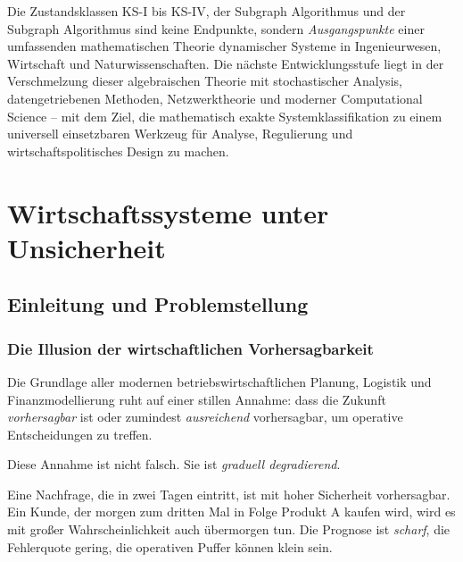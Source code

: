 \documentclass[a4paper, 12pt, twoside, openright]{report}
\theoremstyle{definition}
\theoremstyle{definition}
\begin{document}
Die Zustandsklassen KS-I bis KS-IV, der Subgraph Algorithmus und der Subgraph Algorithmus
sind keine Endpunkte, sondern \emph{Ausgangspunkte} einer umfassenden mathematischen
Theorie dynamischer Systeme in Ingenieurwesen, Wirtschaft und Naturwissenschaften.
Die nächste Entwicklungsstufe liegt in der Verschmelzung dieser algebraischen Theorie
mit stochastischer Analysis, datengetriebenen Methoden, Netzwerktheorie und moderner
Computational Science -- mit dem Ziel, die mathematisch exakte Systemklassifikation
zu einem universell einsetzbaren Werkzeug für Analyse, Regulierung und
wirtschaftspolitisches Design zu machen.

\cleardoublepage


\chapter{Wirtschaftssysteme unter Unsicherheit}
\label{ch:uncertainty-economics}

\section{Einleitung und Problemstellung}

\subsection{Die Illusion der wirtschaftlichen Vorhersagbarkeit}

Die Grundlage aller modernen betriebswirtschaftlichen Planung, Logistik und Finanzmodellierung ruht auf einer stillen Annahme: dass die Zukunft \emph{vorhersagbar} ist oder zumindest \emph{ausreichend} vorhersagbar, um operative Entscheidungen zu treffen.

Diese Annahme ist nicht falsch. Sie ist \emph{graduell degradierend}. 

Eine Nachfrage, die in zwei Tagen eintritt, ist mit hoher Sicherheit vorhersagbar. Ein Kunde, der morgen zum dritten Mal in Folge Produkt A kaufen wird, wird es mit großer Wahrscheinlichkeit auch übermorgen tun. Die Prognose ist \emph{scharf}, die Fehlerquote gering, die operativen Puffer können klein sein.
\end{document}
